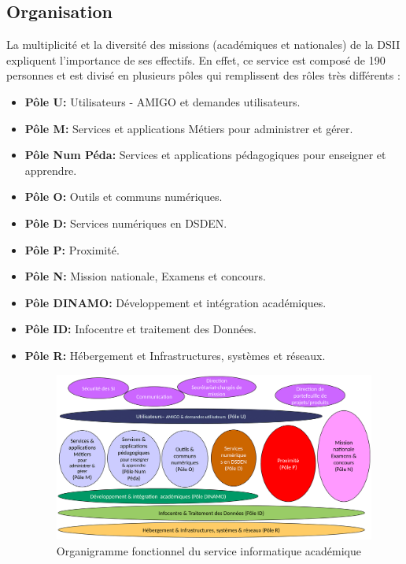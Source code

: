 \documentclass[12pt]{article}
\begin{document}
\subsection{Organisation}

La multiplicité et la diversité des missions (académiques et nationales) de la DSII expliquent l’importance de ses effectifs. En effet, ce service est composé de 190 personnes et est divisé en plusieurs pôles qui remplissent des rôles très différents :
\begin{itemize}
\item \textbf{Pôle U: } Utilisateurs - AMIGO et demandes utilisateurs.
\item \textbf{Pôle M: } Services et applications Métiers pour administrer et gérer.
\item \textbf{Pôle Num Péda: } Services et applications pédagogiques pour enseigner et apprendre.
\item \textbf{Pôle O: } Outils et communs numériques.
\item \textbf{Pôle D: } Services numériques en DSDEN.
\item \textbf{Pôle P: } Proximité.	
\item \textbf{Pôle N: } Mission nationale, Examens et concours.
\item \textbf{Pôle DINAMO: } Développement et intégration académiques.
\item \textbf{Pôle ID: } Infocentre et traitement des Données.
\item \textbf{Pôle R: } Hébergement et Infrastructures, systèmes et réseaux.


\begin{figure}[H]
	\centering
 		\includegraphics[width=1\textwidth]{diagrammes/organigramme_DSII.png}
  		\caption{Organigramme fonctionnel du service informatique académique}
	\end{figure}

\end{itemize}
\end{document}
